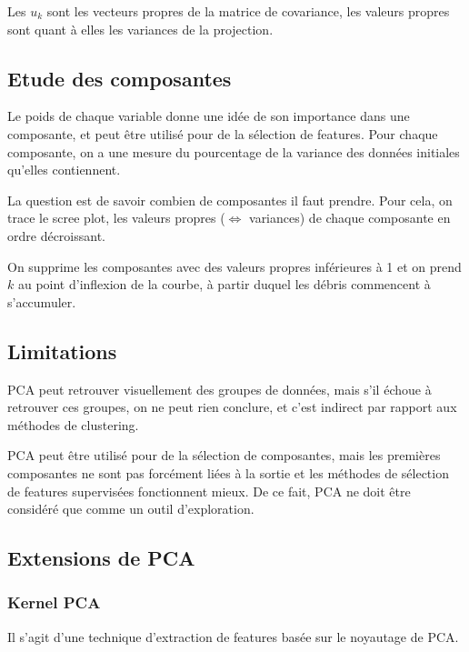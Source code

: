 	Les $u_k$ sont les vecteurs propres de la matrice de covariance, les valeurs propres sont quant à elles les variances de la projection.
	
	\subsection{Etude des composantes}
	
	
	Le poids de chaque variable donne une idée de son importance dans une composante, et peut être utilisé pour de la sélection de features. Pour chaque composante, on a une mesure du pourcentage de la variance des données initiales qu'elles contiennent.
	
	La question est de savoir combien de composantes il faut prendre. Pour cela, on trace le scree plot, les valeurs propres ($\Leftrightarrow$ variances) de chaque composante en ordre décroissant.
	
	
	On supprime les composantes avec des valeurs propres inférieures à 1 et on prend $k$ au point d'inflexion de la courbe, à partir duquel les débris commencent à s'accumuler.
	
	\subsection{Limitations}
	
	PCA peut retrouver visuellement des groupes de données, mais s'il échoue à retrouver ces groupes, on ne peut rien conclure, et c'est indirect par rapport aux méthodes de clustering.
	
	PCA peut être utilisé pour de la sélection de composantes, mais les premières composantes ne sont pas forcément liées à la sortie et les méthodes de sélection de features supervisées fonctionnent mieux. De ce fait, PCA ne doit être considéré que comme un outil d'exploration.
	
	\subsection{Extensions de PCA}
	
		\subsubsection{Kernel PCA}
		
		Il s'agit d'une technique d'extraction de features basée sur le noyautage de PCA.
		
